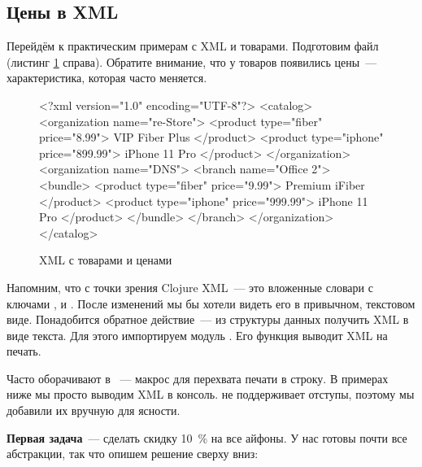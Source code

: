 \subsection{Цены в XML}


Перейдём к практическим примерам с XML и товарами. Подготовим файл
 (листинг \ref{fig:chart-xml-01} справа). Обратите
внимание, что у товаров появились цены~--- характеристика, которая часто
меняется.

\begin{figure}[ht!]

\begin{english}
  \begin{xml}
<?xml version="1.0" encoding="UTF-8"?>
<catalog>
  <organization name="re-Store">
    <product type="fiber" price="8.99">
      VIP Fiber Plus
    </product>
    <product type="iphone" price="899.99">
      iPhone 11 Pro
    </product>
  </organization>
  <organization name="DNS">
    <branch name="Office 2">
      <bundle>
        <product type="fiber" price="9.99">
          Premium iFiber
        </product>
        <product type="iphone" price="999.99">
          iPhone 11 Pro
        </product>
      </bundle>
    </branch>
  </organization>
</catalog>
  \end{xml}
\end{english}

\captionsetup{labelformat=lis}
\caption{XML с товарами и ценами}

\label{fig:chart-xml-01}

\end{figure}

Напомним, что с точки зрения Clojure XML~--- это вложенные словари с ключами
,  и . После изменений мы бы хотели видеть его в
привычном, текстовом виде. Понадобится обратное действие~--- из структуры данных
получить XML в виде текста. Для этого импортируем модуль . Его
функция  выводит XML на печать.


Часто  оборачивают в ~--- макрос для перехвата печати в
строку. В примерах ниже мы просто выводим XML в консоль.  не поддерживает
отступы, поэтому мы добавили их вручную для ясности.

\textbf{Первая задача}~--- сделать скидку 10~\% на все айфоны. У нас готовы почти все
абстракции, так что опишем решение сверху вниз:

